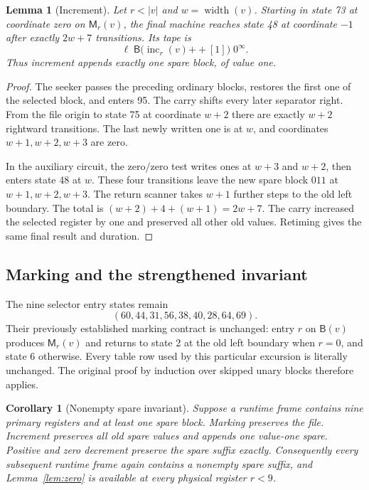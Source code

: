 \documentclass[11pt]{article}
\newtheorem{lemma}{Lemma}
\newtheorem{corollary}{Corollary}
\newcommand{\B}{\mathsf B}
\newcommand{\M}{\mathsf M}
\newcommand{\width}{\operatorname{width}}
\newcommand{\Inc}{\operatorname{inc}}
\newcommand{\concat}{\mathbin{+\!+}}
\begin{document}
\begin{lemma}[Increment]\label{lem:increment}
Let $r<|v|$ and $w=\width(v)$.  Starting in state 73 at coordinate zero
on $\M_r(v)$, the final machine reaches state 48 at coordinate $-1$
after exactly $2w+7$ transitions.  Its tape is
\[
 \ell\;\B\bigl(\Inc_r(v)\concat[1]\bigr)\;0^\infty.
\]
Thus increment appends exactly one spare block, of value one.
\end{lemma}
\begin{proof}
The seeker passes the preceding ordinary blocks, restores the first
one of the selected block, and enters 95.  The carry shifts every later
separator right.  From the file origin to state 75 at coordinate $w+2$
there are exactly $w+2$ rightward transitions.  The last newly written
one is at $w$, and coordinates $w+1,w+2,w+3$ are zero.

In the auxiliary circuit, the zero/zero test writes ones at $w+3$ and
$w+2$, then enters state 48 at $w$.  These four transitions leave the
new spare block $011$ at $w+1,w+2,w+3$.  The return scanner takes $w+1$
further steps to the old left boundary.  The total is
$(w+2)+4+(w+1)=2w+7$.  The carry increased the selected register by one
and preserved all other old values.  Retiming gives the same final
result and duration.
\end{proof}

\subsection{Marking and the strengthened invariant}

The nine selector entry states remain
\[
(60,44,31,56,38,40,28,64,69).
\]
Their previously established marking contract is unchanged: entry $r$
on $\B(v)$ produces $\M_r(v)$ and returns to state 2 at the old left
boundary when $r=0$, and state 6 otherwise.  Every table row used by this
particular excursion is literally unchanged.  The original proof by
induction over skipped unary blocks therefore applies.

\begin{corollary}[Nonempty spare invariant]
Suppose a runtime frame contains nine primary registers and at least
one spare block.  Marking preserves the file.  Increment preserves
all old spare values and appends one value-one spare.  Positive and
zero decrement preserve the spare suffix exactly.  Consequently every
subsequent runtime frame again contains a nonempty spare suffix, and
Lemma~\ref{lem:zero} is available at every physical register $r<9$.
\end{corollary}
\end{document}
